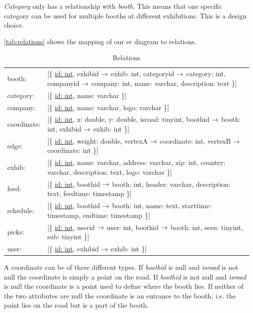 \textit{Category} only has a relationship with \textit{booth}. This means that one specific category can be used for multiple booths at different exhibitions. This is a design choice.

\autoref{tab:relations} shows the mapping of our \ac{er} diagram to relations.

\newcommand{\relation}[1]{[\{ #1 \}]\\}

\begin{table}[H]
\centering
\small
\begin{tabular}{p{1.2cm} p{9.6cm}}
booth: & \relation{\underline{id: int}, exhibid $\rightarrow$ exhib: int, categoryid $\rightarrow$ category: int, companyid $\rightarrow$ company: int, name: varchar, description: text}
category: & \relation{\underline{id: int}, name: varchar}
company: & \relation{\underline{id: int}, name: varchar, logo: varchar}
coordinate: & \relation{\underline{id: int}, x: double, y: double, isroad: tinyint, boothid $\rightarrow$ booth: int, exhibid $\rightarrow$ exhib: int}
edge: & \relation{\underline{id: int}, weight: double, vertexA $\rightarrow$ coordinate: int, vertexB $\rightarrow$ coordinate: int}
exhib: & \relation{\underline{id: int}, name: varchar, address: varchar, zip: int, country: varchar, description: text, logo: varchar}
feed: & \relation{\underline{id: int}, boothid $\rightarrow$ booth: int, header: varchar, description: text, feedtime: timestamp}
schedule: & \relation{\underline{id: int}, boothid $\rightarrow$ booth: int, name: text, starttime: timestamp, endtime: timestamp}
picks: & \relation{\underline{id: int}, userid $\rightarrow$ user: int, boothid $\rightarrow$ booth: int, seen: tinyint, sub: tinyint}
user: & \relation{\underline{id: int}, exhibid $\rightarrow$ exhib: int}
\end{tabular}
\caption{Relations}
\label{tab:relations}
\end{table}
A coordinate can be of three different types. If \textit{boothid} is null and \textit{isroad} is not null the coordinate is simply a point on the road. If \textit{boothid} is not null and \textit{isroad} is null the coordinate is a point used to define where the booth lies. If neither of the two attributes are null the coordinate is an entrance to the booth, i.e. the point lies on the road but is a part of the booth.
